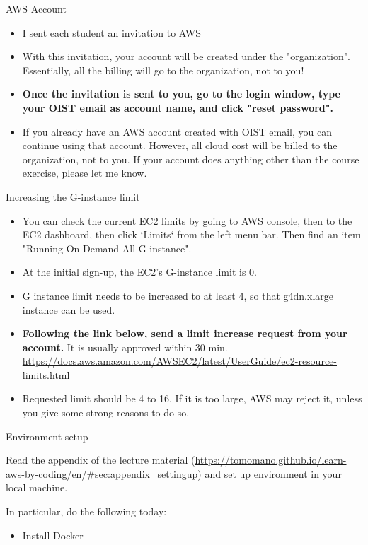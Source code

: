 \documentclass[unicode,11pt]{beamer}
\begin{document}
\begin{frame}{AWS Account}

\begin{itemize}
    \item I sent each student an invitation to AWS
    \item With this invitation, your account will be created under the "organization".
    Essentially, all the billing will go to the organization, not to you!
    \item \textbf{Once the invitation is sent to you, go to the login window, type your OIST email as account name, and click "reset password".}
    \item If you already have an AWS account created with OIST email, you can continue using that account.
    However, all cloud cost will be billed to the organization, not to you.
    If your account does anything other than the course exercise, please let me know.
\end{itemize}

\end{frame}

\begin{frame}{Increasing the G-instance limit}

\begin{itemize}
    \item You can check the current EC2 limits by going to AWS console, then to the EC2 dashboard, then click `Limits` from the left menu bar.
    Then find an item "Running On-Demand All G instance".
    \item At the initial sign-up, the EC2's G-instance limit is 0.
    \item G instance limit needs to be increased to at least 4, so that g4dn.xlarge instance can be used.
    \item \textbf{Following the link below, send a limit increase request from your account.}
    It is usually approved within 30 min.
    \url{https://docs.aws.amazon.com/AWSEC2/latest/UserGuide/ec2-resource-limits.html}
    \item Requested limit should be 4 to 16.
    If it is too large, AWS may reject it, unless you give some strong reasons to do so.
\end{itemize}

\end{frame}

\begin{frame}{Environment setup}

Read the appendix of the lecture material (\url{https://tomomano.github.io/learn-aws-by-coding/en/#sec:appendix_settingup}) and set up environment in your local machine.

In particular, do the following today:

\begin{itemize}
    \item Install Docker
\end{itemize}

\end{frame}
\end{document}
